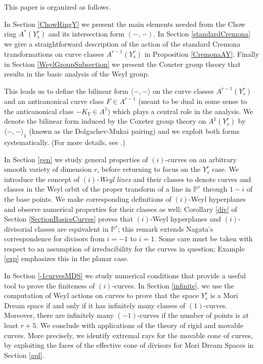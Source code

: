 \documentclass[12pt]{article}
\numberwithin{equation}{section}
\numberwithin{subeq}{equation}
\def\bbP{\mathbb{P}}
\begin{document}
This paper is organized as follows.

In Section \ref{ChowRingY}
we present the main elements needed
from the Chow ring $A^*(Y^r_s)$ and its intersection form $(-,-)$.
In Section \ref{standardCremona} we give a straightforward description
of the action of the standard Cremona transformations
on curve classes $A^{r-1}(Y^r_s)$
in Proposition \eqref{CremonaAY}.
Finally in Section \ref{WeylGroupSubsection}
we present the Coxeter group theory that results in the basic
analysis of the Weyl group.

This leads us to define the bilinear form 
$\langle -,-\rangle$ on the curve classes $A^{r-1}(Y^r_s)$
and an anticanonical curve class $F \in A^{r-1}$
(meant to be dual in some sense to the anticanonical class $-K_Y \in A^1$)
which plays a central role in the analysis.
We denote the bilinear form induced by the Coxeter group theory on $A^1(Y^r_s)$
by $\langle -,-\rangle_1$
(known as the Dolgachev-Mukai pairing) and we exploit both forms systematically.
(For more details, see \cite{DM2}.)

In Section \ref{gen} we study general properties of $(i)$-curves
on an arbitrary smooth variety of dimension $r$,
before returning to focus on the $Y^r_s$ case.
We introduce the concept of \emph{$(i)$-Weyl lines}
and their classes to denote curves and classes
in the Weyl orbit of the proper transform 
of a line in $\bbP^r$ through $1-i$ of the base points.
We make corresponding definitions of $(i)$-Weyl hyperplanes
and observe numerical properties for their classes as well;
Corollary \eqref{div} of Section \ref{SectionBasicsCurves} proves that
$(i)$-Weyl hyperplanes and $(i)$-divisorial classes are equivalent in $\bbP^r$;
this remark extends Nagata's correspondence for divisors
from $i=-1$ \cite{DP} to $i=1$.
Some care must be taken with respect to
an assumption of irreducibility for the curves in question;
Example \eqref{exp} emphasizes this in the planar case.

In Section \ref{-1curvesMDS} we study numerical conditions that
provide a useful tool to prove the finiteness of $(i)$-curves.
In Section \ref{infinite}, we use the computation of Weyl actions on curves
to prove that the space $Y^r_s$ is a Mori Dream space if and only if 
it has infinitely many classes of $(1)$-curves.
Moreover, there are infinitely many $(-1)$-curves
if the number of points is at least $r+5$.
We conclude with applications of the theory of rigid and movable curves.
More precisely, we identify extremal rays for the movable cone of curves,
by exploiting the faces of the effective cone of divisors for Mori Dream Spaces in Section \ref{apl}. 
\end{document}
